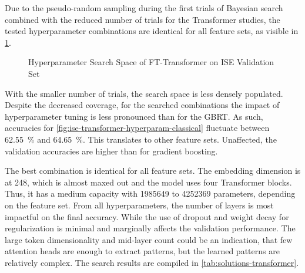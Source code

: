 Due to the pseudo-random sampling during the first trials of Bayesian search combined with the reduced number of trials for the Transformer studies, the tested hyperparameter combinations are identical for all feature sets, as visible in \cref{fig:ise-transformer-hyperparam}.

\begin{figure}[!ht]
    \vfill
    \caption[Hyperparameter Search Space of FT-Transformer]{Hyperparameter Search Space of FT-Transformer on \gls{ISE} Validation Set}
    \label{fig:ise-transformer-hyperparam}
\end{figure}
\clearpage
\begin{figure}[!ht]
    \ContinuedFloat
\end{figure}

With the smaller number of trials, the search space is less densely populated. Despite the decreased coverage, for the searched combinations the impact of hyperparameter tuning is less pronounced than for the \gls{GBRT}. As such, accuracies for \cref{fig:ise-transformer-hyperparam-classical} fluctuate between \SI{62.55}{\percent} and \SI{64.65}{\percent}. This translates to other feature sets. Unaffected, the validation accuracies are higher than for gradient boosting.

The best combination is identical for all feature sets. The embedding dimension is at \num{248}, which is almost maxed out and the model uses four Transformer blocks. Thus, it has a medium capacity with \num{1985649} to \num{4252369} parameters, depending on the feature set. From all hyperparameters, the number of layers is most impactful on the final accuracy. While the use of dropout and weight decay for regularization is minimal and marginally affects the validation performance. The large token dimensionality and mid-layer count could be an indication, that few attention heads are enough to extract patterns, but the learned patterns are relatively complex. The search results are compiled in \cref{tab:solutions-transformer}.

